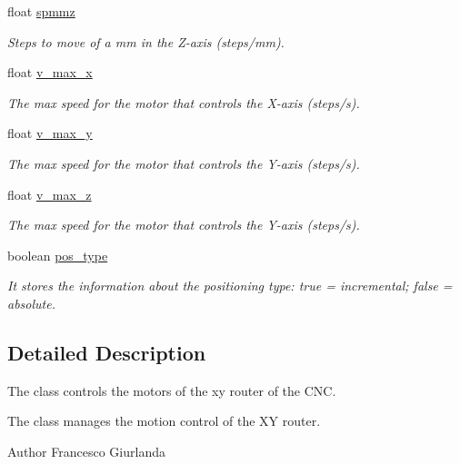 \begin{DoxyCompactItemize}
float \hyperlink{class_c_n_c___router_a18bda26476d6fbe11fc6bb6ec69171ea}{spmmz}
\begin{DoxyCompactList}\small\item\em Steps to move of a mm in the Z-\/axis (steps/mm). \end{DoxyCompactList}\item 
float \hyperlink{class_c_n_c___router_afa08612e63f2cc3d3283fa06679b5d7a}{v\+\_\+max\+\_\+x}
\begin{DoxyCompactList}\small\item\em The max speed for the motor that controls the X-\/axis (steps/s). \end{DoxyCompactList}\item 
float \hyperlink{class_c_n_c___router_a5e3fe2fd85292f3f5d9d2e13078b6a42}{v\+\_\+max\+\_\+y}
\begin{DoxyCompactList}\small\item\em The max speed for the motor that controls the Y-\/axis (steps/s). \end{DoxyCompactList}\item 
float \hyperlink{class_c_n_c___router_a9e6e9d29184c011ec64e9648995af4cb}{v\+\_\+max\+\_\+z}
\begin{DoxyCompactList}\small\item\em The max speed for the motor that controls the Y-\/axis (steps/s). \end{DoxyCompactList}\item 
boolean \hyperlink{class_c_n_c___router_afd35356064c7667cbdf21c44a7dd7cf5}{pos\+\_\+type}
\begin{DoxyCompactList}\small\item\em It stores the information about the positioning type\+: true = incremental; false = absolute. \end{DoxyCompactList}\end{DoxyCompactItemize}


\subsection{Detailed Description}
The class controls the motors of the xy router of the C\+N\+C. 

The class manages the motion control of the X\+Y router. \begin{DoxyAuthor}{Author}
Francesco Giurlanda 
\end{DoxyAuthor}


